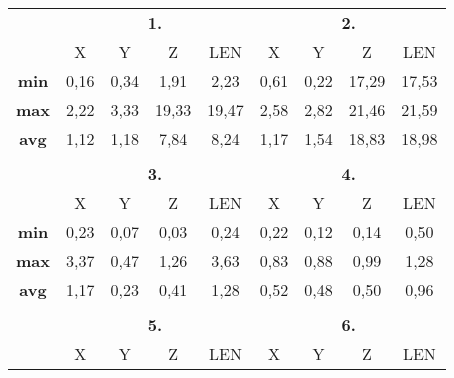 \documentclass{article}
\begin{document}
	\begin{table}[H]
\centering
\begin{tabular}{ccccccccc}
\multicolumn{1}{c|}{}             & \multicolumn{4}{c|}{\textbf{1.}}                  & \multicolumn{4}{c}{\textbf{2.}}               \\
\multicolumn{1}{c|}{\textbf{}}    & X    & Y    & Z     & \multicolumn{1}{c|}{LEN}    & X         & Y         & Z         & LEN       \\ \hline
\multicolumn{1}{c|}{\textbf{min}} & 0,16 & 0,34 & 1,91  & \multicolumn{1}{c|}{2,23}   & 0,61      & 0,22      & 17,29     & 17,53     \\
\multicolumn{1}{c|}{\textbf{max}} & 2,22 & 3,33 & 19,33 & \multicolumn{1}{c|}{19,47}  & 2,58      & 2,82      & 21,46     & 21,59     \\
\multicolumn{1}{c|}{\textbf{avg}} & 1,12 & 1,18 & 7,84  & \multicolumn{1}{c|}{8,24}   & 1,17      & 1,54      & 18,83     & 18,98     \\
\textbf{}                         &      &      &       &                             &           &           &           &           \\
\multicolumn{1}{c|}{}             & \multicolumn{4}{c|}{\textbf{3.}}                  & \multicolumn{4}{c}{\textbf{4.}}               \\
\multicolumn{1}{c|}{\textbf{}}    & X    & Y    & Z     & \multicolumn{1}{c|}{LEN}    & X         & Y         & Z         & LEN       \\ \hline
\multicolumn{1}{c|}{\textbf{min}} & 0,23 & 0,07 & 0,03  & \multicolumn{1}{c|}{0,24}   & 0,22      & 0,12      & 0,14      & 0,50      \\
\multicolumn{1}{c|}{\textbf{max}} & 3,37 & 0,47 & 1,26  & \multicolumn{1}{c|}{3,63}   & 0,83      & 0,88      & 0,99      & 1,28      \\
\multicolumn{1}{c|}{\textbf{avg}} & 1,17 & 0,23 & 0,41  & \multicolumn{1}{c|}{1,28}   & 0,52      & 0,48      & 0,50      & 0,96      \\
\textbf{}                         &      &      &       &                             &           &           &           &           \\
\multicolumn{1}{c|}{}             & \multicolumn{4}{c|}{\textbf{5.}}                  & \multicolumn{4}{c}{\textbf{6.}}               \\
\multicolumn{1}{c|}{\textbf{}}    & X    & Y    & Z     & \multicolumn{1}{c|}{LEN}    & X         & Y         & Z         & LEN       \\ \hline

\end{tabular}
\end{table}
\end{document}
